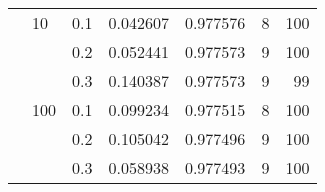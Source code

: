 \begin{table}[H]
\begin{tabular}{lllrrrr}
       & 10  & 0.1 &  0.042607 &  0.977576 &       8 &   100 \\
       &     & 0.2 &  0.052441 &  0.977573 &       9 &   100 \\
       &     & 0.3 &  0.140387 &  0.977573 &       9 &    99 \\
       & 100 & 0.1 &  0.099234 &  0.977515 &       8 &   100 \\
       &     & 0.2 &  0.105042 &  0.977496 &       9 &   100 \\
       &     & 0.3 &  0.058938 &  0.977493 &       9 &   100 \\
\bottomrule
\end{tabular}
\end{table}
